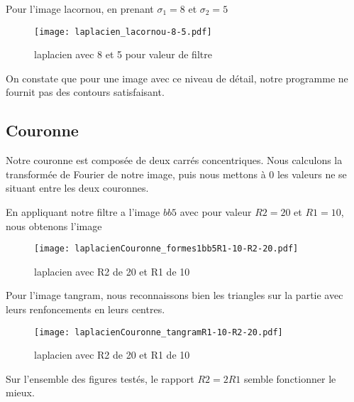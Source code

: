 \documentclass[12pt]{article}
\numberwithin{equation}{section}
\begin{document}
Pour l'image lacornou, en prenant $\sigma_1=8$ et $\sigma_2=5$

	\begin{figure}[!ht]
        \begin{center}
           \texttt{[image: laplacien\_lacornou-8-5.pdf]} 
           \caption{laplacien avec 8 et 5 pour valeur de filtre}
        \end{center}
    \end{figure}

On constate que pour une image avec ce niveau de détail, notre programme ne fournit pas des contours satisfaisant.

\subsection{Couronne}

Notre couronne est composée de deux carrés concentriques. Nous calculons la transformée de Fourier de notre image, puis nous mettons à $0$ les valeurs ne se situant entre les deux couronnes.

En appliquant notre filtre a l'image $bb5$ avec pour valeur $R2=20$ et $R1=10$, nous obtenons l'image

	\begin{figure}[!ht]
        \begin{center}
           \texttt{[image: laplacienCouronne\_formes1bb5R1-10-R2-20.pdf]} 
           \caption{laplacien avec R2 de 20 et R1 de 10}
        \end{center}
    \end{figure}

Pour l'image tangram, nous reconnaissons bien les triangles sur la partie avec leurs renfoncements en leurs centres.

	\begin{figure}[!ht]
        \begin{center}
           \texttt{[image: laplacienCouronne\_tangramR1-10-R2-20.pdf]} 
           \caption{laplacien avec R2 de 20 et R1 de 10}
        \end{center}
    \end{figure}

Sur l'ensemble des figures testés, le rapport $R2=2R1$ semble fonctionner le mieux.
\end{document}

